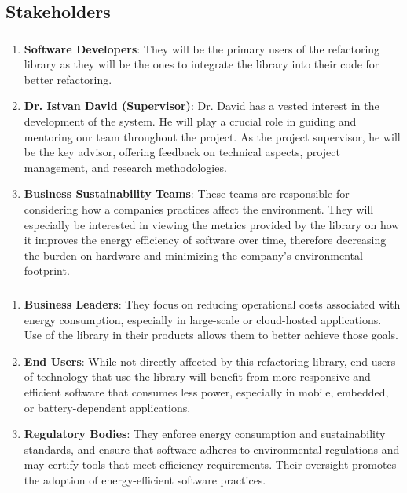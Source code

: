 \documentclass{article}
\begin{document}
\subsection{Stakeholders}
\subsubsection*{\color{blue}{Direct Stakeholders}}
\begin{enumerate}

    \item \textbf{Software Developers}: They will be the primary users of the refactoring library as they will be the ones to integrate the library into their code for better refactoring.
    \item \textbf{Dr. Istvan David (Supervisor)}: Dr. David has a vested interest in the development of the system. He will play a crucial role in guiding and mentoring our team throughout the project. As the project supervisor, he will be the key advisor, offering feedback on technical aspects, project management, and research methodologies. 
    \item \textbf{Business Sustainability Teams}: These teams are responsible for considering how a companies practices affect the environment. They will especially be interested in viewing the metrics provided by the library on how it improves the energy efficiency of software over time, therefore decreasing the burden on hardware and minimizing the company's environmental footprint.

\end{enumerate}

\subsubsection*{\color{blue}{Indirect Stakeholders}}
\begin{enumerate}

    \item \textbf{Business Leaders}: They focus on reducing operational costs associated with energy consumption, especially in large-scale or cloud-hosted applications. Use of the library in their products allows them to better achieve those goals. 
    \item \textbf{End Users}: While not directly affected by this refactoring library, end users of technology that use the library will benefit from more responsive and efficient software that consumes less power, especially in mobile, embedded, or battery-dependent applications. 
    \item \textbf{Regulatory Bodies}: They enforce energy consumption and sustainability standards, and ensure that software adheres to environmental regulations and may certify tools that meet efficiency requirements. Their oversight promotes the adoption of energy-efficient software practices.

\end{enumerate}
\end{document}
